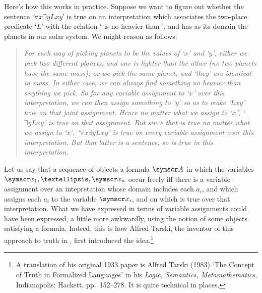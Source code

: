 \begin{earg}
Here's how this works in practice. Suppose we want to figure out whether the sentence `$\forall x \exists y Lxy$' is true on an interpretation which  associates the two-place predicate `$L$' with the relation ` is no heavier than ', and has as its domain the planets in our solar system. We might reason as follows: \begin{quote}
	\emph{For each way of picking planets to be the values of `$x$' and `$y$', either we pick two different planets, and one is lighter than the other (no two planets have the same mass); or we pick the same planet, and `they' are identical in mass. In either case, we can always find something no heavier than anything we pick. So for any variable assignment to `$x$' over this interpretation,  we can then assign something to `$y$' so as to make `$Lxy$' true on that joint assignment. Hence no matter what we assign to `$x$', `$\exists y Lxy$' is true on that assignment. But since that is true no matter what we assign to `$x$', `$\forall x \exists y Lxy$' is true on every variable assignment over this interpretation. But that latter is a sentence, so is true in this interpretation.}
\end{quote}

Let us say that a sequence of objects   a formula $\meta{A}$ in which the variables $\meta{x}_{1},…,\meta{x}_{n}$ occur freely iff there is a variable assignment over an intepretation whose domain includes each $a_{i}$, and which assigns each $a_{i}$ to the variable $\meta{x}_{i}$, and on which  is true over that interpretation. What we have expressed in terms of variable assignments could have been expressed, a little more awkwardly, using the notion of some objects satisfying a formula. Indeed, this is how Alfred Tarski, the inventor of this approach to truth in \FOL, first introduced the idea.\footnote{A translation of his original 1933 paper is Alfred Tarski (1983) `The Concept of Truth in Formalized Languages' in his \emph{Logic, Semantics, Metamathematics}, Indianapolis: Hackett, pp.\ 152–278. It is quite technical in places.}



\end{earg}
